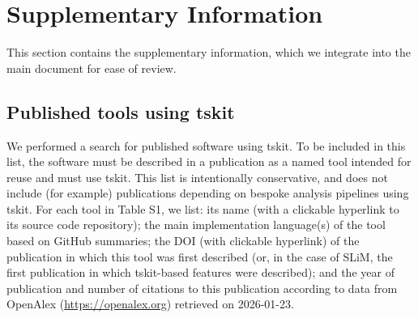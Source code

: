 \documentclass{article}
\begin{document}
\newpage

\section*{Supplementary Information}
\appendix
\setcounter{table}{0}
\setcounter{figure}{0}
\renewcommand{\thetable}{S\arabic{table}}
\renewcommand{\thefigure}{S\arabic{figure}}
\renewcommand{\thesubsection}{\arabic{subsection}}

This section contains the supplementary information, which we integrate
into the main document for ease of review.

\subsection*{Published tools using tskit}
We performed a search for published software using tskit.
To be included in this list, the software must be described in a publication
as a named tool intended for reuse and must use tskit.
This list is intentionally conservative, and does not include
(for example) publications depending on bespoke analysis
pipelines using tskit.
For each tool in Table S1, we list: its name (with a clickable
hyperlink to its source code repository);
the main implementation
language(s) of the tool based on GitHub summaries;
the DOI (with clickable hyperlink) of the publication in which this
tool was first described (or, in the case of SLiM, the first
publication in which tskit-based features were described);
and the year of publication and number of citations to this
publication according to data from OpenAlex
(\url{https://openalex.org}) retrieved on 2026-01-23.


\end{document}
